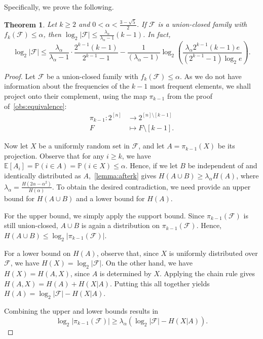\documentclass[a4paper,12pt]{article}
\theoremstyle{mystyle}	%
\newtheorem{theorem}{Theorem}[section]
\theoremstyle{definition}
\newcommand{\E}{\mathbb{E}}
\newcommand{\F}{\mathcal{F}}
\renewcommand{\Pr}{\mathbb{P}}
\newcommand{\6}{\partial}
\begin{document}
Specifically, we prove the following.
    \begin{theorem}\label{thm:largeNew}
        Let $k\geq 2$ and $0 < \alpha<\frac{3-\sqrt{5}}{2}$. If $\F$ is a union-closed family with $f_k(\F)\leq \alpha$, then $\log_2|\F|\leq \frac{\lambda_\alpha}{\lambda_\alpha-1}(k-1)$. In fact,
        \[\log_2|\F| \leq \frac{\lambda_\alpha}{\lambda_\alpha-1}\cdot \frac{2^{k-1}(k-1)}{2^{k-1}-1} -\frac{1}{(\lambda_\alpha-1)}\log_2\left(\frac{\lambda_\alpha2^{k-1}(k-1)e}{(2^{k-1}-1)\log_2 e }\right).\]
    \end{theorem}
	\begin{proof}
            Let $\F$ be a union-closed family with $f_k(\F) \le \alpha$. As we do not have information about the frequencies of the $k-1$ most frequent elements, we shall project onto their complement, using the map $\pi_{k-1}$ from the proof of~\cref{obs:equivalence}:
	\begin{align*}
		\pi_{k-1}: 2^{[n]}&\to 2^{[n]\setminus[k-1]}\\
		F&\mapsto F\setminus [k-1].
	\end{align*}
	
        Now let $X$ be a uniformly random set in $\F$, and let $A = \pi_{k-1}(X)$ be its projection. Observe that for any $i \ge k$, we have $\E[A_i] = \Pr(i \in A) = \Pr(i \in X) \le \alpha$. Hence, if we let $B$ be independent of and identically distributed as $A$,~\cref{lemma:afterk} gives $H(A\cup B)\geq \lambda_\alpha H(A)$, where $\lambda_{\alpha}=\frac{H(2\alpha-\alpha^2)}{H(\alpha)}$. To obtain the desired contradiction, we need provide an upper bound for $H(A\cup B)$ and a lower bound for $H(A)$. 	
	
	For the upper bound, we simply apply the support bound. Since $\pi_{k-1}(\F)$ is still union-closed, $A\cup B$ is again a distribution on $\pi_{k-1}(\F)$. Hence, $H(A\cup B)\leq \log_2|\pi_{k-1}(\F)|$. 
	
	For a lower bound on $H(A)$, observe that, since $X$ is uniformly distributed over $\F$, we have $H(X) = \log_2 |\F|$. On the other hand, we have $H(X)=H(A,X)$, since $A$ is determined by $X$. Applying the chain rule gives $H(A,X)=H(A)+H(X|A)$. Putting this all together yields $H(A)=\log_2|\F|-H(X|A)$.

    Combining the upper and lower bounds results in
    \begin{equation} \label{eqn:entropy}
        \log_2 |\pi_{k-1}(\F)| \ge \lambda_\alpha \left( \log_2 |\F| - H(X|A) \right).
    \end{equation}
    

\end{proof}
\end{document}
